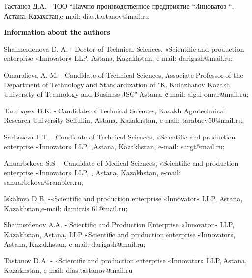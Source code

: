 Тастанов Д.А. - ТОО ``Научно-производственное предприятие ``Инноватор
``, Астана, Казахстан,e-mail: dias.tastanov@mail.ru

{\bfseries Information about the authors}

Shaimerdenova D. A. - Doctor of Technical Sciences, «Scientific and
production enterprise «Innovator» LLP, Astana, Kazakhstan, e-mail:
darigash@mail.ru;

Omaralieva A. M. - Candidate of Technical Sciences, Associate Professor
of the Department of Technology and Standardization of "K. Kulazhanov
Kazakh University of Technology and Business JSC" Astana, е-mail:
aigul-omar@mail.ru;

Tarabayev B.K. - Candidate of Technical Sciences, Kazakh Agrotechnical
Research University Seifullin, Astana, Kazakhstan, e-mail:
tarabaev50@mail.ru;

Sarbasova L.T. - Candidate of Technical Sciences, «Scientific and
production enterprise «Innovator» LLP, ,Astana, Kazakhstan, e-mail:
sargt@mail.ru;

Anuarbekova S.S. - Candidate of Medical Sciences, «Scientific and
production enterprise «Innovator» LLP, , Astana, Kazakhstan, e-mail:
sanuarbekova@rambler.ru;

Iskakova D.B. -«Scientific and production enterprise «Innovator» LLP,
Astana, Kazakhstan,e-mail: damirais 61@mail.ru;

Shaimerdenov A.A. - Scientific and Production Enterprise «Innovator»
LLP, Kazakhstan, Astana, LLP «Scientific and production enterprise
«Innovator», Astana, Kazakhstan, e-mail: darigash@mail.ru;

Tastanov D.A. - «Scientific and production enterprise «Innovator» LLP,
Astana, Kazakhstan, e-mail: dias.tastanov@mail.ru









